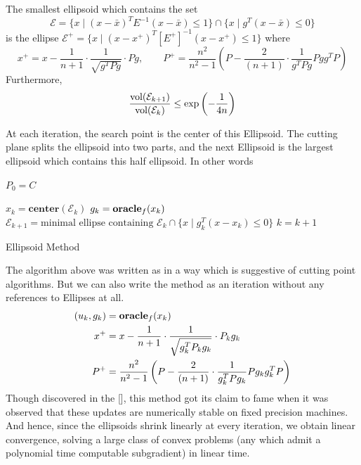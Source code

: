 \begin{fact} The smallest ellipsoid which contains the set 
$$
\mathcal{E} = \{ x \mid (x - \bar{x})^T E^{-1} (x - \bar{x}) \leq 1\} \cap \{ x \mid g^T(x - \bar{x}) \leq 0\}
$$
is the ellipse $ \mathcal{E^+} = \{ x \mid (x - x^+)^T[E^+]^{-1} (x - x^+) \leq 1 \} $
where
$$
x^{+} =x-\frac{1}{n+1}\cdot\frac{1}{\sqrt{g^{T}Pg}}\cdot Pg, \qquad
P^{+} =\frac{n^{2}}{n^{2}-1}\left(P-\frac{2}{(n+1)}\cdot\frac{1}{g^{T}Pg}Pgg^{T}P\right)
$$
Furthermore, 
$$\frac{\textnormal{vol} (\mathcal{E}_{k+1})}{\textnormal{vol} (\mathcal{E}_{k})} \leq \exp\left(-\frac{1}{4n}\right)$$
\end{fact}

At each iteration, the search point is the center of this Ellipsoid. The cutting plane splits the
ellipsoid into two parts, and the next Ellipsoid is the largest ellipsoid
which contains this half ellipsoid. In other words

\begin{algorithm} 
  \SetAlgoNoLine
  \DontPrintSemicolon
  $P_0 = C$\;
  
   {
  \nl $x_{k}  = \mathbf{center}(\mathcal{E}_k)$\;
  \nl $g_k = \mbox{\bf oracle}_f(x_k)$\;
  \nl $\mathcal{E}_{k+1} = \mbox{minimal ellipse containing }\mathcal{E}_k \cap \{x \mid g_k^T(x -x_k) \leq 0 \}$\;
  \nl $k = k + 1$
  }
  \caption{Ellipsoid Method \label{alg:ellipsoid}}
\end{algorithm}

The algorithm above was written as in a way which is suggestive of cutting point
algorithms. But we can also write the method as an iteration without any references to Ellipses at all. 
\begin{align*}
(u_k,g_{k}) & =\mbox{\bf oracle}_f(x_{k})\\
x^{+} & =x-\frac{1}{n+1}\cdot\frac{1}{\sqrt{g_{k}^{T}P_{k}g_{k}}}\cdot P_{k}g_{k}\\
P^{+} & =\frac{n^{2}}{n^{2}-1}\left(P-\frac{2}{(n+1)}\cdot\frac{1}{g_{k}^{T}Pg_{k}}Pg_{k}g_{k}^{T}P\right)
\end{align*}
Though discovered in the [], this method got its claim to fame when it was
observed that these updates are numerically stable on fixed precision machines.
And hence, since the ellipsoids shrink linearly at every iteration, we obtain
linear convergence, solving a large class of convex problems (any which admit
a polynomial time computable subgradient) in linear time. 

